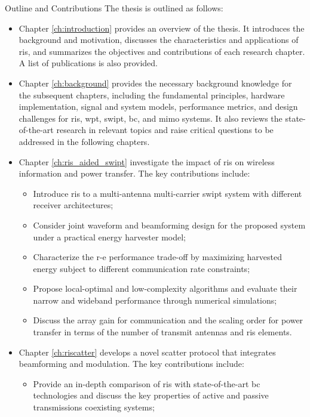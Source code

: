 \begin{section}{Outline and Contributions}
	The thesis is outlined as follows:
	\begin{itemize}
		\item Chapter \ref{ch:introduction} provides an overview of the thesis. It introduces the background and motivation, discusses the characteristics and applications of \gls{ris}, and summarizes the objectives and contributions of each research chapter. A list of publications is also provided.
		\item Chapter \ref{ch:background} provides the necessary background knowledge for the subsequent chapters, including the fundamental principles, hardware implementation, signal and system models, performance metrics, and design challenges for \gls{ris}, \gls{wpt}, \gls{swipt}, \gls{bc}, and \gls{mimo} systems. It also reviews the state-of-the-art research in relevant topics and raise critical questions to be addressed in the following chapters.
		\item Chapter \ref{ch:ris_aided_swipt} investigate the impact of \gls{ris} on wireless information and power transfer. The key contributions include:
		\begin{itemize}
			\item Introduce \gls{ris} to a multi-antenna multi-carrier \gls{swipt} system with different receiver architectures;
			\item Consider joint waveform and beamforming design for the proposed system under a practical energy harvester model;
			\item Characterize the \gls{r-e} performance trade-off by maximizing harvested energy subject to different communication rate constraints;
			\item Propose local-optimal and low-complexity algorithms and evaluate their narrow and wideband performance through numerical simulations;
			\item Discuss the array gain for communication and the scaling order for power transfer in terms of the number of transmit antennas and \gls{ris} elements.
		\end{itemize}
		\item Chapter \ref{ch:riscatter} develops a novel scatter protocol that integrates beamforming and modulation. The key contributions include:
		\begin{itemize}
			\item Provide an in-depth comparison of \gls{ris} with state-of-the-art \gls{bc} technologies and discuss the key properties of active and passive transmissions coexisting systems;

\end{itemize}
\end{itemize}
\end{section}
